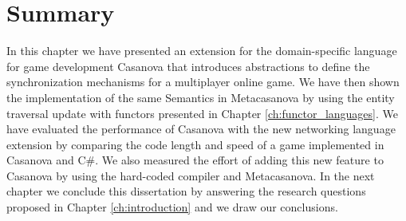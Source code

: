 \section{Summary}
In this chapter we have presented an extension for the domain-specific language for game development Casanova that introduces abstractions to define the synchronization mechanisms for a multiplayer online game. We have then shown the implementation of the same Semantics in Metacasanova by using the entity traversal update with functors presented in Chapter \ref{ch:functor_languages}. We have evaluated the performance of Casanova with the new networking language extension by comparing the code length and speed of a game implemented in Casanova and C\#. We also measured the effort of adding this new feature to Casanova by using the hard-coded compiler and Metacasanova. In the next chapter we conclude this dissertation by answering the research questions proposed in Chapter \ref{ch:introduction} and we draw our conclusions.

